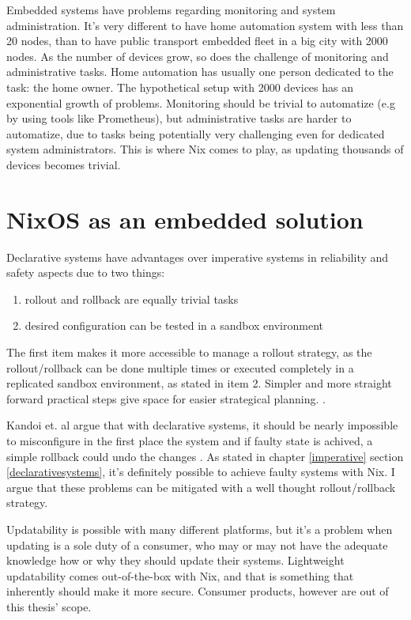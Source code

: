 Embedded systems have problems regarding monitoring and system
administration. It's very different to have home automation system
with less than 20 nodes, than to have public transport embedded fleet
in a big city with 2000 nodes. As the number of devices grow, so does
the challenge of monitoring and administrative tasks. Home automation
has usually one person dedicated to the task: the home owner. The
hypothetical setup with 2000 devices has an exponential growth of
problems. Monitoring should be trivial to automatize (e.g by using
tools like Prometheus), but administrative tasks are harder to
automatize, due to tasks being potentially very challenging even for
dedicated system administrators. This is where Nix comes to play, as
updating thousands of devices becomes trivial.


\section{NixOS as an embedded solution} \label{nixosassolution}

Declarative systems have advantages over imperative systems in
reliability and safety aspects due to two things:

\begin{enumerate}

\item rollout and rollback are equally trivial tasks
\item desired configuration can be tested in a sandbox environment
  
\end{enumerate}

The first item makes it more accessible to manage a rollout strategy,
as the rollout/rollback can be done multiple times or executed
completely in a replicated sandbox environment, as stated in item
2. Simpler and more straight forward practical steps give space for
easier strategical planning. \cite{kandoi2021operating}.

Kandoi et. al argue that with declarative systems, it should be nearly
impossible to misconfigure in the first place the system and if faulty
state is achived, a simple rollback could undo the changes
\cite{kandoi2021operating}. As stated in chapter \ref{imperative}
section \ref{declarativesystems}, it's definitely possible to achieve
faulty systems with Nix. I argue that these problems can be mitigated
with a well thought rollout/rollback strategy.

Updatability is possible with many different platforms, but it's a
problem when updating is a sole duty of a consumer, who may or may not
have the adequate knowledge how or why they should update their
systems. Lightweight updatability comes out-of-the-box with Nix, and
that is something that inherently should make it more secure. Consumer
products, however are out of this thesis' scope.

